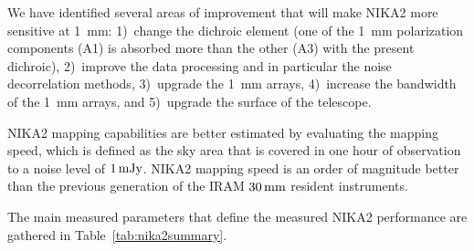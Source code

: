 We have identified several areas of improvement that will make NIKA2
more sensitive at 1~mm: 1)~change the dichroic element (one of
the 1~mm polarization components (A1) is absorbed more than the other (A3)
with the present dichroic), 2)~improve the data processing and in
particular the noise decorrelation methods, 3)~upgrade the 1~mm
arrays, 4)~increase the bandwidth of the 1~mm arrays, and 5)~upgrade
the surface of the telescope.

NIKA2 mapping capabilities are better estimated by evaluating the
mapping speed, which is defined as the sky area that is covered in one
hour of observation to a noise level of $1\,\rm{mJy}$. NIKA2 mapping
speed is an order of magnitude better than the previous generation of
the IRAM $30\,\rm{mm}$ resident instruments. 


The main measured parameters that define the measured NIKA2 performance
are gathered in Table~\ref{tab:nika2summary}.

